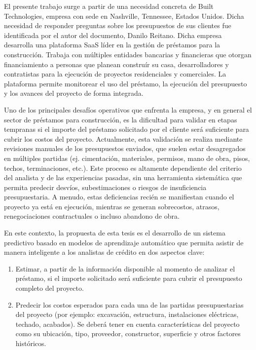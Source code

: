 \documentclass[
11pt, %
]{charter}
\begin{document}
El presente trabajo surge a partir de una necesidad concreta de Built Technologies, empresa con sede en Nashville, Tennessee, Estados Unidos. Dicha necesidad de responder preguntas sobre los presupuestos de sus clientes fue identificada por el autor del documento, Danilo Reitano. Dicha empresa desarrolla una plataforma SaaS líder en la gestión de préstamos para la construcción. Trabaja con múltiples entidades bancarias y financieras que otorgan financiamiento a personas que planean construír su casa, desarrolladores y contratistas para la ejecución de proyectos residenciales y comerciales. La plataforma permite monitorear el uso del préstamo, la ejecución del presupuesto y los avances del proyecto de forma integrada.

Uno de los principales desafíos operativos que enfrenta la empresa, y en general el sector de préstamos para construcción, es la dificultad para validar en etapas tempranas si el importe del préstamo solicitado por el cliente será suficiente para cubrir los costos del proyecto. Actualmente, esta validación se realiza mediante revisiones manuales de los presupuestos enviados, que suelen estar desagregados en múltiples partidas (ej. cimentación, materiales, permisos, mano de obra, pisos, techos, terminaciones, etc.). Este proceso es altamente dependiente del criterio del analista y de las experiencias pasadas, sin una herramienta sistemática que permita predecir desvíos, subestimaciones o riesgos de insuficiencia presupuestaria. A menudo, estas deficiencias recién se manifiestan cuando el proyecto ya está en ejecución, mientras se generan sobrecostos, atrasos, renegociaciones contractuales o incluso abandono de obra.

En este contexto, la propuesta de esta tesis es el desarrollo de un sistema predictivo basado en modelos de aprendizaje automático que permita asistir de manera inteligente a los analistas de crédito en dos aspectos clave:

\begin{enumerate}
    \item Estimar, a partir de la información disponible al momento de analizar el préstamo, si el importe solicitado será suficiente para cubrir el presupuesto completo del proyecto.
    \item Predecir los costos esperados para cada una de las partidas presupuestarias del proyecto (por ejemplo: excavación, estructura, instalaciones eléctricas, techado, acabados). Se deberá tener en cuenta características del proyecto como su ubicación, tipo, proveedor, constructor, superficie y otros factores históricos.
\end{enumerate}
\end{document}
